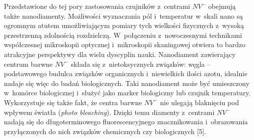 Przedstawione do tej pory zastosowania czujników z~centrami $NV^{-}$ obejmują także nanodiamenty. Możliwości wyznaczania pól i~temperatur w~skali nano są ogromnym atutem umożliwiającym pomiary tych  wielkości fizycznych z~wysoką przestrzenną zdolnością rozdzielczą. W~połączeniu  z~nowoczesnymi technikami współczesnej mikroskopii optycznej i~mikroskopii skaningowej otwiera to bardzo atrakcyjne perspektywy dla wielu dyscyplin nauki. Nanodiament zawierający centrum barwne $NV^{-}$ składa się z~nietoksycznych związków: węgla – podstawowego budulca związków organicznych i~niewielkich ilości azotu, idealnie nadaje się więc do badań biologicznych. Taki nanodiament może być umieszczony w~komórce biologicznej i~służyć jako marker biologiczny lub czujnik temperatury. Wykorzystuje się także fakt, że centra barwne $NV^{-}$ nie ulegają blaknięciu pod wpływem światła (\textit{photo bleaching}). Dzięki temu diamenty z~centrami $NV^{-}$ nadają się do długoterminowego fluorescencyjnego znacznikowania i~obrazowania przyłączonych do nich związków chemicznych czy biologicznych [5].

